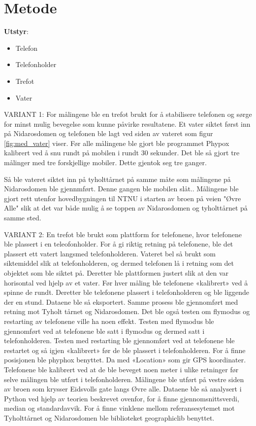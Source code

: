\section{Metode}
\noindent\textbf{Utstyr}:
\begin{itemize}
    \item Telefon
    \item Telefonholder
    \item Trefot
    \item Vater
\end{itemize}
VARIANT 1:
For målingene ble en trefot brukt for å stabilisere telefonen og sørge for minst mulig bevegelse som kunne påvirke resultatene. Et vater siktet først inn på Nidarosdomen og telefonen ble lagt ved siden av vateret som figur \ref{fig:med_vater} viser. Før alle målingene ble gjort ble programmet Phypox kalibrert ved å snu rundt på mobilen i rundt 30 sekunder. Det ble så gjort tre målinger med tre forskjellige mobiler. Dette gjentok seg tre ganger.

Så ble vateret siktet inn på tyholttårnet på samme måte som målingene på Nidarosdomen ble gjennmført. Denne gangen ble mobilen slåt..
Målingene ble gjort rett utenfor hovedbygningen til NTNU i starten av broen på veien "Øvre Alle" slik at det var både mulig å se toppen av Nidarosdomen og tyholttårnet på samme sted.  \newline


VARIANT 2:
En trefot ble brukt som plattform for telefonene, hvor telefonene ble plassert i en teleofonholder. For å gi riktig retning på telefonene, ble det plassert ett vatert langsmed telefonholderen. Vateret bel så brukt som siktemiddel slik at telefonholderen, og dermed telefonen lå i retning som det objektet som ble siktet på. Deretter ble plattformen justert slik at den var horisontal ved hjelp av et vater. 
Før hver måling ble telefonene «kalibrert» ved å spinne de rundt. Deretter ble telefonene plassert i telefonholderen og ble liggende der en stund. Dataene ble så eksportert. Samme prosess ble gjennomført med retning mot Tyholt tårnet og Nidarosdomen. 
Det ble også testen om flymodus og restarting av telefonene ville ha noen effekt. Testen med flymodus ble gjennomført ved at telefonene ble satt i flymodus og dermed satt i telefonholderen. Testen med restarting ble gjennomført ved at telefonene ble restartet og så igjen «kalibrert» før de ble plassert i telefonholderen.
For å finne posisjonen ble phyphox benyttet. Da med «Location» som gir GPS koordinater. Telefonene ble kalibrert ved at de ble beveget noen meter i ulike retninger før selve målingen ble utført i telefonholderen. Målingene ble utført på vestre siden av broen som krysser Eidsvolls gate langs Øvre alle. 
Dataene ble så analysert i Python ved hjelp av teorien beskrevet ovenfor, for å finne gjennomsnittsverdi, median og standardavvik. For å finne vinklene mellom referansesytemet mot Tyholttårnet og Nidarosdomen ble biblioteket geographiclib benyttet.  

